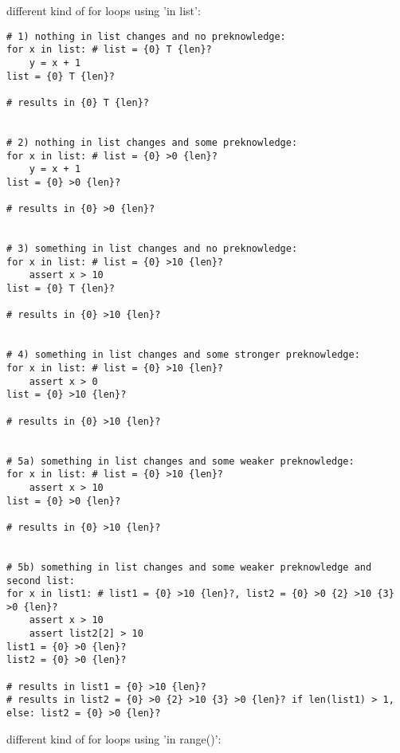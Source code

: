 \documentclass[11pt]{article}
\begin{document}
different kind of for loops using 'in list':

\begin{lstlisting}[numbers=none]
# 1) nothing in list changes and no preknowledge:
for x in list: # list = {0} T {len}?
    y = x + 1
list = {0} T {len}?

# results in {0} T {len}?


# 2) nothing in list changes and some preknowledge:
for x in list: # list = {0} >0 {len}?
    y = x + 1
list = {0} >0 {len}?

# results in {0} >0 {len}?


# 3) something in list changes and no preknowledge:
for x in list: # list = {0} >10 {len}?
    assert x > 10
list = {0} T {len}?

# results in {0} >10 {len}?


# 4) something in list changes and some stronger preknowledge:
for x in list: # list = {0} >10 {len}?
    assert x > 0
list = {0} >10 {len}?

# results in {0} >10 {len}?


# 5a) something in list changes and some weaker preknowledge:
for x in list: # list = {0} >10 {len}?
    assert x > 10
list = {0} >0 {len}?

# results in {0} >10 {len}?


# 5b) something in list changes and some weaker preknowledge and second list:
for x in list1: # list1 = {0} >10 {len}?, list2 = {0} >0 {2} >10 {3} >0 {len}?
    assert x > 10
    assert list2[2] > 10
list1 = {0} >0 {len}?
list2 = {0} >0 {len}?

# results in list1 = {0} >10 {len}?
# results in list2 = {0} >0 {2} >10 {3} >0 {len}? if len(list1) > 1, else: list2 = {0} >0 {len}?
\end{lstlisting}



different kind of for loops using 'in range()':
\end{document}
